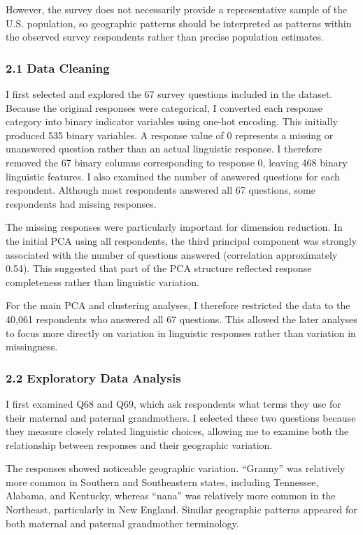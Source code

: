 \documentclass[
]{article}
\begin{document}
However, the survey does not necessarily provide a representative sample
of the U.S. population, so geographic patterns should be interpreted as
patterns within the observed survey respondents rather than precise
population estimates.

\subsubsection{2.1 Data Cleaning}\label{data-cleaning}

I first selected and explored the 67 survey questions included in the
dataset. Because the original responses were categorical, I converted
each response category into binary indicator variables using one-hot
encoding. This initially produced 535 binary variables. A response value
of 0 represents a missing or unanswered question rather than an actual
linguistic response. I therefore removed the 67 binary columns
corresponding to response 0, leaving 468 binary linguistic features. I
also examined the number of answered questions for each respondent.
Although most respondents answered all 67 questions, some respondents
had missing responses.

The missing responses were particularly important for dimension
reduction. In the initial PCA using all respondents, the third principal
component was strongly associated with the number of questions answered
(correlation approximately 0.54). This suggested that part of the PCA
structure reflected response completeness rather than linguistic
variation.

For the main PCA and clustering analyses, I therefore restricted the
data to the 40,061 respondents who answered all 67 questions. This
allowed the later analyses to focus more directly on variation in
linguistic responses rather than variation in missingness.

\subsubsection{2.2 Exploratory Data
Analysis}\label{exploratory-data-analysis}

I first examined Q68 and Q69, which ask respondents what terms they use
for their maternal and paternal grandmothers. I selected these two
questions because they measure closely related linguistic choices,
allowing me to examine both the relationship between responses and their
geographic variation.

The responses showed noticeable geographic variation. ``Granny'' was
relatively more common in Southern and Southeastern states, including
Tennessee, Alabama, and Kentucky, whereas ``nana'' was relatively more
common in the Northeast, particularly in New England. Similar geographic
patterns appeared for both maternal and paternal grandmother
terminology.
\end{document}
